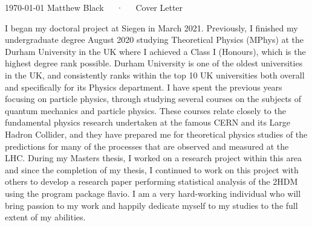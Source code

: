 \documentclass[11pt, a4paper]{awesome-cv}
\begin{document}
\makecvheader[R]

\makecvfooter
  {\today}
  {Matthew Black~~~·~~~Cover Letter}
  {}

\vspace{-20pt}
\makelettertitle

\begin{cvletter}

I began my doctoral project at Siegen in March 2021.
Previously, I finished my undergraduate degree August 2020 studying Theoretical Physics (MPhys) at the Durham University in the UK where I achieved a Class I (Honours), which is the highest degree rank possible. 
Durham University is one of the oldest universities in the UK, and consistently ranks within the top 10 UK universities both overall and specifically for its Physics department.
I have spent the previous years focusing on particle physics, through studying several courses on the subjects of quantum mechanics and particle physics.
These courses relate closely to the fundamental physics research undertaken at the famous CERN and its Large Hadron Collider, and they have prepared me for theoretical physics studies of the predictions for many of the processes that are observed and measured at the LHC. 
During my Masters thesis, I worked on a research project within this area and since the completion of my thesis, I continued to work on this project with others to develop a research paper performing statistical analysis of the 2HDM using the program package flavio.
I am a very hard-working individual who will bring passion to my work and happily dedicate myself to my studies to the full extent of my abilities. 



\end{cvletter}
\end{document}
